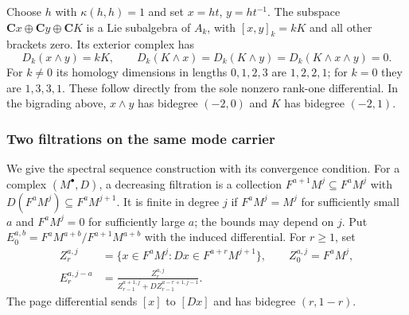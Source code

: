 \begin{example}
\label{ex:km-three-modes}
Choose $h$ with $\kappa(h,h)=1$ and set $x=ht$, $y=ht^{-1}$.
The subspace $\mathbf Cx\oplus\mathbf Cy\oplus\mathbf CK$ is a Lie subalgebra
of $A_k$, with $[x,y]_k=kK$ and all other brackets zero.
Its exterior complex has
\[
D_k(x\wedge y)=kK,\qquad D_k(K\wedge x)=D_k(K\wedge y)
=D_k(K\wedge x\wedge y)=0.
\]
For $k\ne0$ its homology dimensions in lengths $0,1,2,3$ are $1,2,2,1$;
for $k=0$ they are $1,3,3,1$.  These follow directly from the sole nonzero
rank-one differential.  In the bigrading above, $x\wedge y$ has bidegree
$(-2,0)$ and $K$ has bidegree $(-2,1)$.
\end{example}

\subsubsection{Two filtrations on the same mode carrier}

We give the spectral sequence construction with its convergence condition.
For a complex $(M^\bullet,D)$, a decreasing filtration is a collection
$F^{a+1}M^j\subseteq F^aM^j$ with $D(F^aM^j)\subseteq F^aM^{j+1}$.
It is finite in degree $j$ if $F^aM^j=M^j$ for sufficiently small $a$ and
$F^aM^j=0$ for sufficiently large $a$; the bounds may depend on $j$.
Put $E_0^{a,b}=F^aM^{a+b}/F^{a+1}M^{a+b}$ with the induced differential.
For $r\ge1$, set
\begin{align*}
Z_r^{a,j}&=\{x\in F^aM^j: Dx\in F^{a+r}M^{j+1}\},\qquad Z_0^{a,j}=F^aM^j,\\
E_r^{a,j-a}&=
\frac{Z_r^{a,j}}{Z_{r-1}^{a+1,j}+D Z_{r-1}^{a-r+1,j-1}}.
\end{align*}
The page differential sends $[x]$ to $[Dx]$ and has bidegree $(r,1-r)$.

